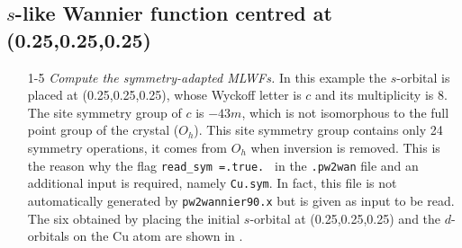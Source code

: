 \subsection*{$s$-like Wannier function centred at (0.25,0.25,0.25)}
\begin{itemize}
	\item [1-5] {\it Compute the symmetry-adapted MLWFs.}
	In this example the $s$-orbital is placed at (0.25,0.25,0.25), whose Wyckoff letter is $c$ and its multiplicity is $8$. The site symmetry group of $c$ is ${-}43m$, which is not isomorphous to the full point group of the crystal ($O_h$). This site symmetry group contains only 24 symmetry operations, \ie{} it comes from $O_h$ when inversion is removed. This is the reason why the flag {\tt read\_sym =.true. } in the {\tt .pw2wan} file and an additional input is required, namely {\tt Cu.sym}. In fact, this file is not automatically generated by {\tt pw2wannier90.x} but is given as input to be read.
    The six \MLWFs{} obtained by placing the initial $s$-orbital at (0.25,0.25,0.25) and the $d$-orbitals on the Cu atom are shown in .
\end{itemize}

